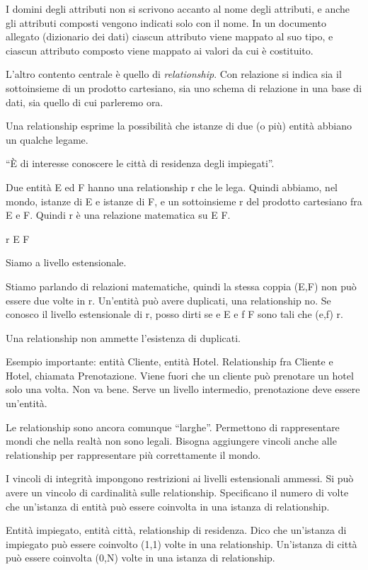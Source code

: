 I domini degli attributi non si scrivono accanto al nome degli attributi, e anche gli attributi composti vengono indicati solo con il nome. In un documento allegato (dizionario dei dati) ciascun attributo viene mappato al suo tipo, e ciascun attributo composto viene mappato ai valori da cui \`e costituito.

L'altro contento centrale \`e quello di \emph{relationship}. Con relazione si indica sia il sottoinsieme di un prodotto cartesiano, sia uno schema di relazione in una base di dati, sia quello di cui parleremo ora.

Una relationship esprime la possibilit\`a che istanze di due (o pi\`u) entit\`a abbiano un qualche legame.

``\`E di interesse conoscere le citt\`a di residenza degli impiegati''.

Due entit\`a E ed F hanno una relationship r che le lega. Quindi abbiamo, nel mondo, istanze di E e istanze di F, e un sottoinsieme r del prodotto cartesiano fra E e F. Quindi r \`e una relazione matematica su E \times F.

r \subseteq E \times F

Siamo a livello estensionale.

Stiamo parlando di relazioni matematiche, quindi la stessa coppia (E,F) non pu\`o essere due volte in r. Un'entit\`a pu\`o avere duplicati, una relationship no. Se conosco il livello estensionale di r, posso dirti se e \in E e f \in F sono tali che (e,f) \in r.

Una relationship non ammette l'esistenza di duplicati.

Esempio importante: entit\`a Cliente, entit\`a Hotel. Relationship fra Cliente e Hotel, chiamata Prenotazione. Viene fuori che un cliente pu\`o prenotare un hotel solo una volta. Non va bene. Serve un livello intermedio, prenotazione deve essere un'entit\`a.

Le relationship sono ancora comunque ``larghe''. Permettono di rappresentare mondi che nella realt\`a non sono legali. Bisogna aggiungere vincoli anche alle relationship per rappresentare pi\`u correttamente il mondo.

I vincoli di integrit\`a impongono restrizioni ai livelli estensionali ammessi. Si pu\`o avere un vincolo di cardinalit\`a sulle relationship. Specificano il numero di volte che un'istanza di entit\`a pu\`o essere coinvolta in una istanza di relationship.

Entit\`a impiegato, entit\`a citt\`a, relationship di residenza. Dico che un'istanza di impiegato pu\`o essere coinvolto (1,1) volte in una relationship. Un'istanza di citt\`a pu\`o essere coinvolta (0,N) volte in una istanza di relationship.

